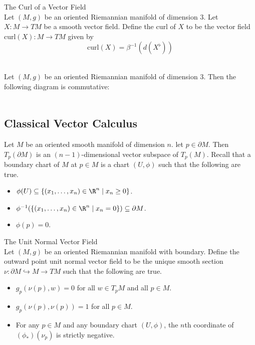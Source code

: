 \documentclass[a4paper]{article}
\begin{document}
\begin{defn}{The Curl of a Vector Field}{}\\
Let $(M,g)$ be an oriented Riemannian manifold of dimension $3$. Let $X:M\to TM$ be a smooth vector field. Define the curl of $X$ to be the vector field $\text{curl}(X):M\to TM$ given by $$\text{curl}(X)=\beta^{-1}(d(X^\flat))$$
\end{defn}

\begin{prp}{}{}\\
Let $(M,g)$ be an oriented Riemannian manifold of dimension $3$. Then the following diagram is commutative: \\
\\
\end{prp}

\subsection{Classical Vector Calculus}
Let $M$ be an oriented smooth manifold of dimension $n$. let $p\in\partial M$. Then $T_p(\partial M)$ is an $(n-1)$-dimensional vector subspace of $T_p(M)$. Recall that a boundary chart of $M$ at $p\in M$ is a chart $(U,\phi)$ such that the following are true. 
\begin{itemize}
\item $\phi(U)\subseteq\{(x_1,\dots,x_n)\in\R^n\;|\;x_n\geq 0\}$. 
\item $\phi^{-1}(\{(x_1,\dots,x_n)\in\R^n\;|\;x_n=0\})\subseteq\partial M$. 
\item $\phi(p)=0$. 
\end{itemize}

\begin{defn}{The Unit Normal Vector Field}{}\\
Let $(M,g)$ be an oriented Riemannian manifold with boundary. Define the outward point unit normal vector field to be the unique smooth section $\nu:\partial M\hookrightarrow M\to TM$ such that the following are true. 
\begin{itemize}
\item $g_p(\nu(p),w)=0$ for all $w\in T_pM$ and all $p\in M$. 
\item $g_p(\nu(p),\nu(p))=1$ for all $p\in M$. 
\item For any $p\in M$ and any boundary chart $(U,\phi)$, the $n$th coordinate of $(\phi_\ast)(\nu_p)$ is strictly negative. 
\end{itemize}
\end{defn}
\end{document}
